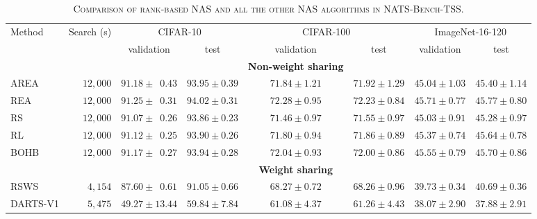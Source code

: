 \documentclass[sigconf]{acmart}
\begin{document}
    \begin{table*}[htb]
        \newcommand{\z}{\phantom{0}}
        \caption{\textsc{Comparison of rank-based NAS and all the other NAS algorithms in NATS-Bench-TSS.}}
        \vspace{-\baselineskip}
        \begin{tabular}{@{}lrcccccc@{}}\toprule
        Method & Search (s) & \multicolumn{2}{c}{CIFAR-10} & \multicolumn{2}{c}{CIFAR-100} & \multicolumn{2}{c}{ImageNet-16-120} \\ \cmidrule(lr){3-4}\cmidrule(lr){5-6}\cmidrule(lr){7-8}
                            &          & validation           & test             & validation           & test             & validation       & test \\ \midrule
                            &          &                      &                  & \textbf{Non-weight sharing} &           &                  &                  \\
        AREA                & $12,000$ & $91.18 \pm \z{0.43}$ & $93.95 \pm 0.39$ & $71.84 \pm 1.21$ & $71.92 \pm 1.29$ & $45.04 \pm 1.03$ & $45.40 \pm 1.14$ \\
        REA                 & $12,000$ & $91.25 \pm \z{0.31}$ & $94.02 \pm 0.31$ & $72.28 \pm 0.95$ & $72.23 \pm 0.84$ & $45.71 \pm 0.77$ & $45.77 \pm 0.80$ \\
        RS                  & $12,000$ & $91.07 \pm \z{0.26}$ & $93.86 \pm 0.23$ & $71.46 \pm 0.97$ & $71.55 \pm 0.97$ & $45.03 \pm 0.91$ & $45.28 \pm 0.97$ \\
        RL                  & $12,000$ & $91.12 \pm \z{0.25}$ & $93.90 \pm 0.26$ & $71.80 \pm 0.94$ & $71.86 \pm 0.89$ & $45.37 \pm 0.74$ & $45.64 \pm 0.78$ \\
        BOHB                & $12,000$ & $91.17 \pm \z{0.27}$ & $93.94 \pm 0.28$ & $72.04 \pm 0.93$ & $72.00 \pm 0.86$ & $45.55 \pm 0.79$ & $45.70 \pm 0.86$ \\ \midrule
                            &          &                      &                  & \textbf{Weight sharing} &               &                  &                  \\
        RSWS                & $4,154$  & $87.60 \pm \z{0.61}$ & $91.05 \pm 0.66$ & $68.27 \pm 0.72$ & $68.26 \pm 0.96$ & $39.73 \pm 0.34$ & $40.69 \pm 0.36$ \\
        DARTS-V1            & $5,475$  & $49.27 \pm 13.44$    & $59.84 \pm 7.84$ & $61.08 \pm 4.37$ & $61.26 \pm 4.43$ & $38.07 \pm 2.90$ & $37.88 \pm 2.91$ \\

\end{tabular}
\end{table*}
\end{document}
